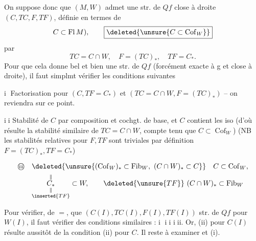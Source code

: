 On suppose donc que $(M,W)$ admet une str. de $Qf$  close à droite $(C,TC,F,TF)$, définie en termes de
\[
 C\subset\operatorname{Fl}M),\qquad\boxed{\deleted{\unsure{C\subset\operatorname{Cof}_{W}}}}
\]
par
\[
 TC=C\cap W,\quad F=(TC)_{*},\quad TF=C_{*}.
\]
Pour que cela donne bel et bien une str. de $Qf$ (forcément exacte à g et close à droite), il faut simplmt  vérifier les conditions suivantes

\textcircled{\scriptsize i} Factorisation pour $(C,TF=C_{*})$ et $(TC=C\cap W,F=(TC)_{*})$ -- on reviendra sur ce point.

\textcircled{\scriptsize ii} Stabilité de $C$ par composition et cochgt. de base, et $C$ contient les iso (d'où résulte la stabilité similaire de $TC=C\cap W$, compte tenu que $C\subset\operatorname{Cof}_{W}$) (NB les stabilités relatives pour $F,TF$ sont triviales par définition $F=(TC)_{*},TF=C_{*}$)

\[
\begin{aligned}
\text{\textcircled{\scriptsize iii}}\quad&
\deleted{\unsure{(\operatorname{Cof}_{W})_{*}\subset\operatorname{Fib}_{W},\ (C\cap W)_{*}\subset C}}\quad C\subset\operatorname{Cof}_{W},\\
&\underset{\substack{\Vert\\\inserted{TF}}}{\overset{\Vert}{C_{*}}}\subset W,\qquad \deleted{\unsure{TF}}\ (C\cap W)_{*}\subset\operatorname{Fib}_{W}
\end{aligned}
\]

Pour vérifier, de $=$,  que  $(C(I),TC(I),F(I),TF(I))$   str. de $Qf$ pour   $W(I)$, il faut vérifier des conditions similaires : \textcircled{\scriptsize i} \textcircled{\scriptsize ii} \textcircled{\scriptsize iii}.  Or, (ii) pour $C(I)$ résulte aussitôt de la condition (ii) pour $C$. Il reste à examiner  et (i).
